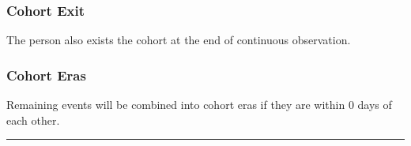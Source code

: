 \documentclass[
  12pt,
]{article}
\begin{document}
\subsubsection{Cohort Exit}\label{cohort-exit-17}

The person also exists the cohort at the end of continuous observation.

\subsubsection{Cohort Eras}\label{cohort-eras-17}

Remaining events will be combined into cohort eras if they are within 0
days of each other.

\begin{center}\rule{0.5\linewidth}{0.5pt}\end{center}
\end{document}

